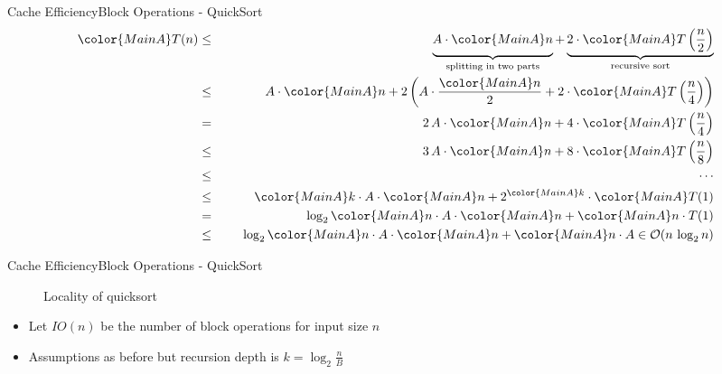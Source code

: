 \begin{frame}{Cache Efficiency}{Block Operations - QuickSort}
  \begin{eqnarray*}
    {\color{MainA}T(n)} &\leq\hspace{1.5em}&
      \underbrace{
        A \cdot {\color{MainA}n}
        \vphantom{\frac{n}{2}}
      }_{\text{splitting in two parts}}
      +
      \underbrace{
        2 \cdot {\color{MainA}T\left(\frac{n}{2}\right)}
      }_{\text{recursive sort}}\\
    {} &\leq&
      A \cdot {\color{MainA}n} + 2 \left(
        A \cdot \frac{\color{MainA}n}{2}
        + 2 \cdot {\color{MainA}T\left(\frac{n}{4}\right)}
      \right)\\
    {} &=&
      2\,A \cdot {\color{MainA}n}
      + 4 \cdot {\color{MainA}T\left(\frac{n}{4}\right)}\\
    {} &\leq&
      3\,A \cdot {\color{MainA}n}
      + 8 \cdot {\color{MainA}T\left(\frac{n}{8}\right)}\\
    {} &\leq&\hspace{1.5em}\cdots\\
    {} &\leq&
      {\color{MainA}k} \cdot A \cdot {\color{MainA}n}
      + 2^{\color{MainA}k}
      \cdot {\color{MainA}T(1)}\\
    {} &=&
      \log_2 {\color{MainA}n} \cdot A \cdot {\color{MainA}n}
      + {\color{MainA}n \cdot T(1)}\\
    {} &\leq&
      \log_2 {\color{MainA}n} \cdot A \cdot {\color{MainA}n}
      + {\color{MainA}n} \cdot A
      \in \mathcal{O}(n \, \log_2 n)
  \end{eqnarray*}
\end{frame}


\begin{frame}{Cache Efficiency}{Block Operations - QuickSort}
  \begin{figure}%
    \begin{adjustbox}{width=\linewidth}%
    \end{adjustbox}%
    \caption{Locality of quicksort}
    \label{fig:caching:memory_locality_quicksort}
  \end{figure}%
  \begin{itemize}
    \item<2->
      Let {\color{MainA}$IO(n)$} be the number of
      {\color{MainA}block operations} for input size {\color{MainA}$n$}
    \item<3->
      Assumptions as before but recursion depth is
      {\color{MainA}$k = \log_2 \frac{n}{B}$}
  \end{itemize}
\end{frame}

